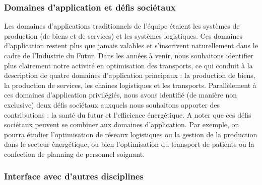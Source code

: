 	
		\subsubsection{Domaines d'application et défis sociétaux} 
	
	Les domaines d'applications traditionnels de l'équipe étaient les systèmes de production (de biens et de services) et les systèmes logistiques. 
	Ces domaines d'application restent plus que jamais valables et s'inscrivent naturellement dans le cadre de l'Industrie du Futur. 
	Dans les années à venir, nous souhaitons identifier plus clairement notre activité en optimisation des transports, ce qui conduit à la description de quatre domaines d'application principaux : la production de biens, la production de services, les chaines logistiques et les transports. Parallèlement à ces domaines d'application privilégiés, nous avons identifié (de manière non exclusive) deux défis sociétaux auxquels nous souhaitons apporter des contributions : la santé du futur et l'efficience énergétique. A noter que ces défis sociétaux peuvent se combiner aux domaines d'application. Par exemple, on pourra étudier l'optimisation de réseaux logistiques ou la gestion de la production dans le secteur énergétique, ou bien l'optimisation du transport de patients ou la confection de planning de personnel soignant. 
	
	
	\subsubsection{Interface avec d'autres disciplines}
	
	
	

